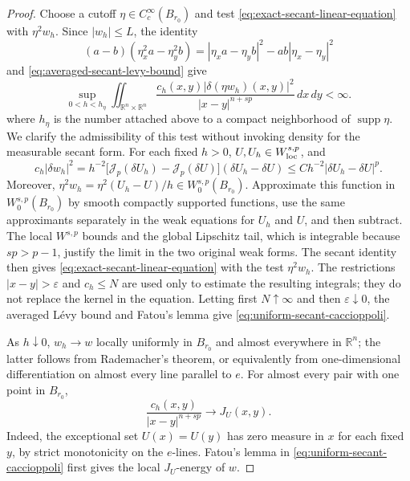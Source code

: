 \documentclass[11pt,reqno]{amsart}
\numberwithin{equation}{section}
\newcommand{\R}{\mathbb R}
\newcommand{\Jp}{\mathcal J_p}
\newcommand{\dd}{\,d}
\theoremstyle{remark}
\begin{document}
\begin{proof}
Choose a cutoff \(\eta\in C_c^\infty(B_{r_0})\) and test
\eqref{eq:exact-secant-linear-equation} with $\eta^2w_h$.  Since
\(|w_h|\le L\), the identity
\[
 (a-b)(\eta_x^2a-\eta_y^2b)
 =|\eta_xa-\eta_yb|^2-ab|\eta_x-\eta_y|^2
\]
and \eqref{eq:averaged-secant-levy-bound} give
\begin{equation}
 \sup_{0<h<h_\eta}
 \iint_{\R^n\times\R^n}
 \frac{c_h(x,y)|\delta(\eta w_h)(x,y)|^2}
 {|x-y|^{n+sp}}\dd x\!\dd y<\infty.
 \label{eq:uniform-secant-caccioppoli}
\end{equation}
where \(h_\eta\) is the number attached above to a compact
neighborhood of \(\operatorname{supp}\eta\).  We clarify the
admissibility of this test without invoking density for the measurable
secant form.  For each fixed \(h>0\),
\(U,U_h\in W^{s,p}_{\rm loc}\), and
\[
 c_h|\delta w_h|^2
 =h^{-2}\bigl[\Jp(\delta U_h)-\Jp(\delta U)\bigr]
             (\delta U_h-\delta U)
 \le Ch^{-2}|\delta U_h-\delta U|^p.
\]
Moreover, \(\eta^2w_h=\eta^2(U_h-U)/h\in W^{s,p}_0(B_{r_0})\).
Approximate this function in \(W^{s,p}_0(B_{r_0})\) by smooth compactly
supported functions, use the same approximants separately in the weak
equations for \(U_h\) and \(U\), and then subtract.  The local
\(W^{s,p}\) bounds and the global Lipschitz tail, which is integrable
because \(sp>p-1\), justify the limit in the two original weak forms.
The secant identity then gives
\eqref{eq:exact-secant-linear-equation} with the test
\(\eta^2w_h\).  The restrictions
\(|x-y|>\varepsilon\) and \(c_h\le N\) are used only to estimate the
resulting integrals; they do not replace the kernel in the equation.
Letting first \(N\uparrow\infty\) and then
\(\varepsilon\downarrow0\), the averaged L\'evy bound and Fatou's
lemma give \eqref{eq:uniform-secant-caccioppoli}.

As $h\downarrow0$, $w_h\to w$ locally uniformly in $B_{r_0}$ and almost
everywhere in $\R^n$; the latter follows from Rademacher's theorem, or
equivalently from one-dimensional differentiation on almost every line
parallel to \(e\).  For almost every pair with one point in
$B_{r_0}$,
\[
 \frac{c_h(x,y)}{|x-y|^{n+sp}}\longrightarrow J_U(x,y).
\]
Indeed, the exceptional set \(U(x)=U(y)\) has zero measure in \(x\)
for each fixed \(y\), by strict monotonicity on the \(e\)-lines.
Fatou's lemma in \eqref{eq:uniform-secant-caccioppoli} first gives the
local \(J_U\)-energy of \(w\).


\end{proof}
\end{document}
